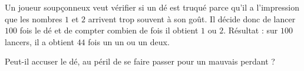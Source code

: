 
\begin{exercice}\label{exosmath-0440}

    Un joueur soupçonneux veut vérifier si un dé est truqué parce qu'il a l'impression que les nombres \( 1\) et \( 2\) arrivent trop souvent à son goût. Il décide donc de lancer \( 100\) fois le dé et de compter combien de fois il obtient \( 1\) ou \( 2\). Résultat : sur \( 100\) lancers, il a obtient \( 44\) fois un un ou un deux.

    Peut-il accuser le dé, au péril de se faire passer pour un mauvais perdant ?

\end{exercice}
